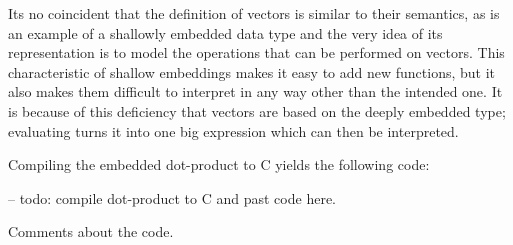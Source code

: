 \documentclass[../main.tex]{subfiles}
\begin{document}
Its no coincident that the definition of vectors is similar to their semantics, as  is an example of a shallowly embedded data type and the very idea of its representation is to model the operations that can be performed on vectors. This characteristic of shallow embeddings makes it easy to add new functions, but it also makes them difficult to interpret in any way other than the intended one. It is because of this deficiency that vectors are based on the deeply embedded  type; evaluating  turns it into one big expression which can then be interpreted.

Compiling the embedded dot-product to C yields the following code:

\begin{code}
-- todo: compile dot-product to C and past code here.
\end{code}

Comments about the code.
\end{document}
